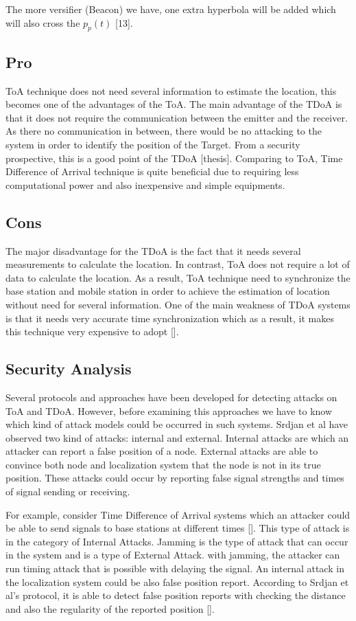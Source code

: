 The more versifier (Beacon) we have, one extra hyperbola will be added which will also cross the $p_p(t)$ [13].

\subsection{Pro}
ToA technique does not need several information to estimate the location, this becomes one of the advantages of the ToA. The main advantage of the TDoA is that it does not require the communication between the emitter and the receiver. As there no communication in between, there would be no attacking to the system in order to identify the position of the Target. From a security prospective, this is a good point of the TDoA [thesis]. Comparing to ToA, Time Difference of Arrival technique is quite beneficial due to requiring less computational power and also inexpensive and simple equipments.


\subsection{Cons}
The major disadvantage for the TDoA is the fact that it needs several measurements to calculate the location. In contrast, ToA does not require a lot of data to calculate the location. As a result, ToA technique need to synchronize the base station and mobile station in order to achieve the estimation of location without need for several information. One of the main weakness of TDoA systems is that it needs very accurate time synchronization which as a result, it makes this technique very expensive to adopt [].

\subsection{Security Analysis}
Several protocols and approaches have been developed for detecting attacks on ToA and TDoA. However, before examining this approaches we have to know which kind of attack models could be occurred in such systems. Srdjan et al have observed two kind of attacks: internal and external. Internal attacks are which an attacker can report a false position of a node. External attacks are able to convince both node and localization system that the node is not in its true position. These attacks could occur by reporting
false signal strengths and times of signal sending or receiving.

For example, consider Time Difference of Arrival systems which an attacker could be able to send signals to base stations at different times []. This type of attack is in the category of Internal Attacks. Jamming is the type of attack that can occur in the system and is a type of External Attack. with jamming, the attacker can run timing attack that is possible with delaying the signal. An internal attack in the localization system could be also false position report. According to Srdjan et al's protocol, it is able to detect false position reports with checking the distance and also the regularity of the reported position [].

